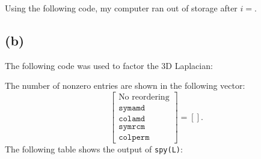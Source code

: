 \documentclass[11pt]{article}
\theoremstyle{definition}
\theoremstyle{remark}
\newcommand{\newpart}{\vspace{-0.5\baselineskip}\hrulefill\vspace{-1.3\baselineskip}}
\theoremstyle{plain}
\begin{document}
Using the following code, my computer ran out of storage after $i=$.

\newpage

\newpart
\subsection*{(b)}

The following code was used to factor the 3D Laplacian:

The number of nonzero entries are shown in the following vector:
\begin{equation*}
  \left[
    \begin{array}{c}
      \textrm{No reordering}\\
      \texttt{symamd}\\
      \texttt{colamd}\\
      \texttt{symrcm}\\
      \texttt{colperm}
    \end{array}
  \right]=
  \left[\right].
\end{equation*}
\newpage
The following table shows the output of \texttt{spy(L)}:
\end{document}
